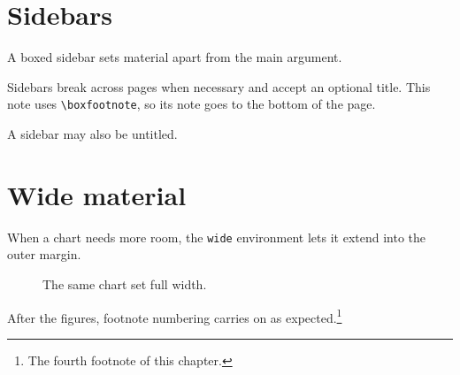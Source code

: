 \section{Sidebars}

A boxed sidebar sets material apart from the main argument.

\begin{sidebox}
  Sidebars break across pages when necessary and accept an optional
  title. This note uses \verb|\boxfootnote|, so its note goes to
  the bottom of the page.
\end{sidebox}

\begin{sidebox}
  A sidebar may also be untitled.
\end{sidebox}

\section{Wide material}

When a chart needs more room, the \texttt{wide} environment lets it
extend into the outer margin.

\begin{figure}[htbp]
  \begin{wide}
    \centering
    
    \caption{The same chart set full width.}
    \label{fig:sample-chart-wide}
  \end{wide}
\end{figure}

After the figures, footnote numbering carries on as
expected.\footnote{The fourth footnote of this chapter.}
